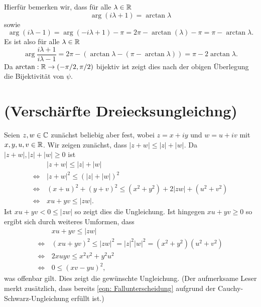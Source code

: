 \documentclass[a4paper,10pt]{article}
\begin{document}
Hierfür bemerken wir, dass für alle $\lambda \in \mathbb{R}$
\[
 \arg (i \lambda + 1) = \arctan \lambda
\]
sowie
\[
 \arg (i \lambda - 1) = \arg(-i \lambda + 1) - \pi = 2 \pi - \arctan (\lambda) - \pi = \pi - \arctan \lambda.
\]
Es ist also für alle $\lambda \in \mathbb{R}$
\[
 \arg \frac{i\lambda+1}{i\lambda-1}
 = 2\pi - \left( \arctan \lambda - (\pi - \arctan \lambda) \right)
 = \pi - 2\arctan \lambda.
\]
Da $\arctan : \mathbb{R} \to (-\pi/2,\pi/2)$ bijektiv ist zeigt dies nach der obigen Überlegung die Bijektivität von $\psi$.





\section{(Verschärfte Dreiecksungleichng)}
Seien $z, w \in \mathbb{C}$ zunächst beliebig aber fest, wobei $z = x+iy$ und $w = u+iv$ mit $x,y,u,v \in \mathbb{R}$. Wir zeigen zunächst, dass $|z+w| \leq |z|+|w|$. Da $|z+w|, |z|+|w| \geq 0$ ist
\begin{align*}
                &\, |z+w| \leq |z|+|w| \\
 \Leftrightarrow&\, |z+w|^2 \leq (|z|+|w|)^2 \\
 \Leftrightarrow&\, (x+u)^2 + (y+v)^2 \leq (x^2+y^2) + 2|zw| + (u^2+v^2) \\
 \Leftrightarrow&\, xu+yv \leq |zw|. \tag{1} \label{eqn: Fallunterscheidung}
\end{align*}
Ist $xu+yv < 0 \leq |zw|$ so zeigt dies die Ungleichung. Ist hingegen $xu+yv \geq 0$ so ergibt sich durch weiteres Umformen, dass
\begin{align*}
                &\, xu + yv \leq |zw| \\
 \Leftrightarrow&\, (xu+yv)^2 \leq |zw|^2 = |z|^2 |w|^2 = (x^2+y^2)(u^2+v^2) \\
 \Leftrightarrow&\, 2xuyv \leq x^2v^2 + y^2u^2 \\
 \Leftrightarrow&\, 0 \leq (xv-yu)^2, \tag{2} \label{eqn: Determinante}
\end{align*}
was offenbar gilt. Dies zeigt die gewünschte Ungleichung. (Der aufmerksame Leser merkt zusätzlich, dass bereits \eqref{eqn: Fallunterscheidung} aufgrund der Cauchy-Schwarz-Ungleichung erfüllt ist.)
\end{document}
